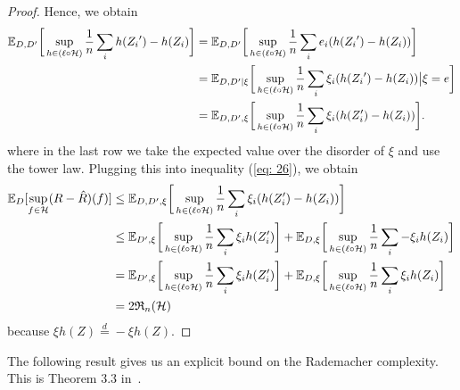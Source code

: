 \documentclass[reqno]{amsart}
\begin{document}
\begin{proposition}[Symmetrization]
\begin{proof}
        Hence, we obtain
        \begin{align}
            \mathbb{E}_{D,D^\prime} \bigg[\sup_{h\in(\ell\circ\mathcal H)}\frac{1}{n} \sum_i h({Z_i}^\prime)-h(Z_i)\bigg] &= \mathbb{E}_{D,D^\prime} \bigg[\sup_{h\in(\ell\circ\mathcal H)}\frac{1}{n}\sum_i e_i(h({Z_i}^\prime)-h(Z_i))\bigg]\\
            &= \mathbb{E}_{D,D^\prime\vert\xi} \bigg[\sup_{h\in(\ell\circ\mathcal H)}\frac{1}{n}\sum_i \xi_i(h({Z_i}^\prime)-h(Z_i))\big\vert \xi = e\bigg]\\
            &= \mathbb{E}_{D,D^\prime,\xi}\bigg[  \sup_{h\in(\ell\circ\mathcal H)} \frac{1}{n} \sum_i \xi_i(h(Z_i')-  h(Z_i)) \bigg].
        \end{align}
        where in the last row we take the expected value over the disorder of $\xi$ and use the tower law.
        Plugging this into inequality (\ref{eq: 26}), we obtain
        \begin{align*}
            \mathbb{E}_D[\sup_{f\in\mathcal{H}} (R-\hat R) (f)] &\le \mathbb{E}_{D,D^\prime,\xi}\bigg[  \sup_{h\in(\ell\circ\mathcal H)} \frac{1}{n} \sum_i \xi_i(h(Z_i')-  h(Z_i)) \bigg]\\
            &\le \mathbb{E}_{D^\prime,\xi}\bigg[  \sup_{h\in(\ell\circ\mathcal H)} \frac{1}{n} \sum_i \xi_i h(Z_i') \bigg] + \mathbb{E}_{D,\xi}\bigg[ \sup_{h\in(\ell\circ\mathcal H)} \frac{1}{n} \sum_i - \xi_i h(Z_i) \bigg]\\
            &= \mathbb{E}_{D^\prime,\xi}\bigg[  \sup_{h\in(\ell\circ\mathcal H)} \frac{1}{n} \sum_i \xi_i h(Z_i') \bigg] + \mathbb{E}_{D,\xi}\bigg[ \sup_{h\in(\ell\circ\mathcal H)} \frac{1}{n} \sum_i \xi_i h(Z_i) \bigg]\\
            &= 2 \mathfrak R_n(\mathcal{H})
        \end{align*}
        because $\xi h(Z) \overset{d}{=} -\xi h(Z)$.
    \end{proof}
\end{proposition}

The following result gives us an explicit bound on the Rademacher complexity. This is Theorem $3.3$ in~\cite{mohri2018foundations}. 
\end{document}
